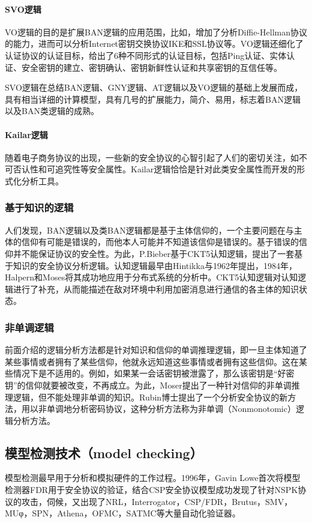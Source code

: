 \documentclass[cs4size,a4pape,UTF8]{ctexart}
\numberwithin{equation}{section}
\numberwithin{table}{section}
\numberwithin{figure}{section}
\begin{document}
\paragraph{SVO逻辑}
VO逻辑的目的是扩展BAN逻辑的应用范围，比如，增加了分析Diffie-Hellman协议的能力，进而可以分析Internet密钥交换协议IKE和SSL协议等。VO逻辑还细化了认证协议的认证目标，给出了6种不同形式的认证目标，包括Ping认证、实体认证、安全密钥的建立、密钥确认、密钥新鲜性认证和共享密钥的互信任等。

SVO逻辑在总结BAN逻辑、GNY逻辑、AT逻辑以及VO逻辑的基础上发展而成，具有相当详细的计算模型，具有几号的扩展能力，简介、易用，标志着BAN逻辑以及BAN类逻辑的成熟。

\paragraph{Kailar逻辑}
随着电子商务协议的出现，一些新的安全协议的心智引起了人们的密切关注，如不可否认性和可追究性等安全属性。Kailar逻辑恰恰是针对此类安全属性而开发的形式化分析工具。

\subsubsection{基于知识的逻辑}

人们发现，BAN逻辑以及类BAN逻辑都是基于主体信仰的，一个主要问题在与主体的信仰有可能是错误的，而他本人可能并不知道该信仰是错误的。基于错误的信仰并不能保证协议的安全性。为此，P.Bieber基于CKT5认知逻辑，提出了一套基于知识的安全协议分析逻辑。认知逻辑最早由Hintikka与1962年提出，1984年，Halpern和Moses将其成功地应用于分布式系统的分析中。CKT5认知逻辑对认知逻辑进行了补充，从而能描述在敌对环境中利用加密消息进行通信的各主体的知识状态。

\subsubsection{非单调逻辑}

前面介绍的逻辑分析方法都是针对知识和信仰的单调推理逻辑，即一旦主体知道了某些事情或者拥有了某些信仰，他就永远知道这些事情或者拥有这些信仰。这在某些情况下是不适用的。例如，如果某一会话密钥被泄露了，那么该密钥是“好密钥”的信仰就要被改变，不再成立。为此，Moser提出了一种针对信仰的非单调推理逻辑，但不能处理非单调的知识。Rubin博士提出了一个分析安全协议的新方法，用以非单调地分析密码协议，这种分析方法称为非单调（Nonmonotomic）逻辑分析方法。

\subsection{模型检测技术（model checking）}
模型检测最早用于分析和模拟硬件的工作过程。1996年，Gavin Lowe首次将模型检测器FDR用于安全协议的验证，结合CSP安全协议模型成功发现了针对NSPK协议的攻击，伺候，又出现了NRL，Interrogator，CSP/FDR，Brutus，SMV，MUφ，SPN，Athena，OFMC，SATMC等大量自动化验证器\cite{1}\cite{6}。
\end{document}
